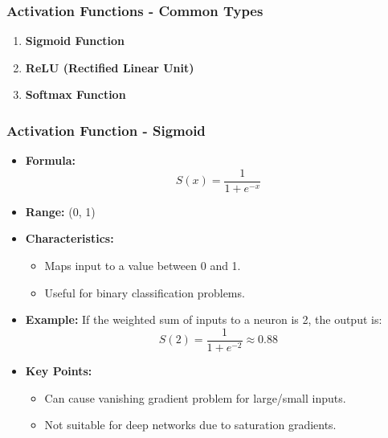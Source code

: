 \documentclass{beamer}
\begin{document}
\begin{frame}[fragile]
    \frametitle{Activation Functions - Common Types}
    \begin{enumerate}
        \item \textbf{Sigmoid Function}
        \item \textbf{ReLU (Rectified Linear Unit)}
        \item \textbf{Softmax Function}
    \end{enumerate}
\end{frame}

\begin{frame}[fragile]
    \frametitle{Activation Function - Sigmoid}
    \begin{itemize}
        \item \textbf{Formula:} 
        \begin{equation}
            S(x) = \frac{1}{1 + e^{-x}}
        \end{equation}
        \item \textbf{Range:} (0, 1)
        \item \textbf{Characteristics:}
        \begin{itemize}
            \item Maps input to a value between 0 and 1.
            \item Useful for binary classification problems.
        \end{itemize}
        \item \textbf{Example:}
        If the weighted sum of inputs to a neuron is 2, the output is:
        \begin{equation}
            S(2) = \frac{1}{1 + e^{-2}} \approx 0.88
        \end{equation}
        \item \textbf{Key Points:}
        \begin{itemize}
            \item Can cause vanishing gradient problem for large/small inputs.
            \item Not suitable for deep networks due to saturation gradients.
        \end{itemize}
    \end{itemize}
\end{frame}
\end{document}
